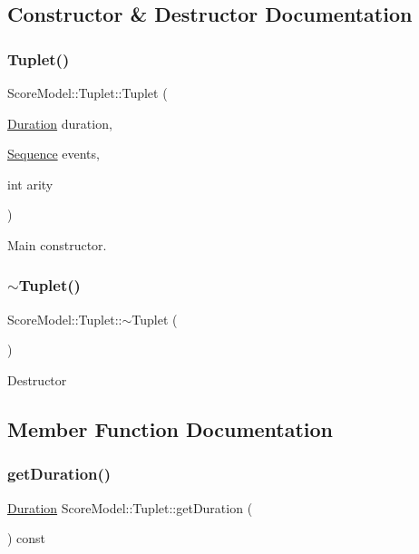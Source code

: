 \subsection{Constructor \& Destructor Documentation}
\mbox{\label{classScoreModel_1_1Tuplet_a123005c7ef369e5120cea3dfad0dc0d3}} 
\subsubsection{\texorpdfstring{Tuplet()}{Tuplet()}}
{\footnotesize\ttfamily Score\+Model\+::\+Tuplet\+::\+Tuplet (\begin{DoxyParamCaption}\item[{\mbox{\hyperlink{classScoreModel_1_1Duration}{Duration}}}]{duration,  }\item[{\mbox{\hyperlink{classScoreModel_1_1Sequence}{Sequence}}}]{events,  }\item[{int}]{arity }\end{DoxyParamCaption})}

Main constructor. \mbox{\label{classScoreModel_1_1Tuplet_ac2a62e001a5238d3d31adf1c73294cbe}} 
\subsubsection{\texorpdfstring{$\sim$Tuplet()}{~Tuplet()}}
{\footnotesize\ttfamily Score\+Model\+::\+Tuplet\+::$\sim$\+Tuplet (\begin{DoxyParamCaption}{ }\end{DoxyParamCaption})}

Destructor 

\subsection{Member Function Documentation}
\mbox{\label{classScoreModel_1_1Tuplet_afed370448df347005471cffea59fa60a}} 
\subsubsection{\texorpdfstring{getDuration()}{getDuration()}}
{\footnotesize\ttfamily \mbox{\hyperlink{classScoreModel_1_1Duration}{Duration}} Score\+Model\+::\+Tuplet\+::get\+Duration (\begin{DoxyParamCaption}{ }\end{DoxyParamCaption}) const}

